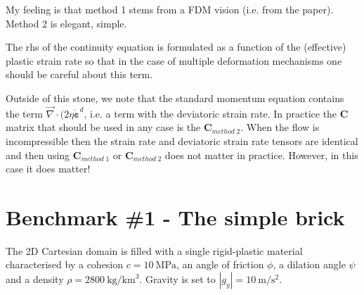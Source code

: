 My feeling is that method 1 stems from a FDM vision (i.e. from the paper). Method 2 is elegant, simple.

\begin{remark}
The rhs of the continuity equation is formulated as a function of the (effective) plastic strain rate so that 
in the case of multiple deformation mechanisms one should be careful about this term.
\end{remark}


\begin{remark}
Outside of this stone, we note that the standard momentum equation contains 
the term $\vec\nabla \cdot (2 \eta \dot{\bm \varepsilon}^d$,
i.e. a term with the deviatoric strain rate.
In practice the  ${\bm C}$ matrix that should be used in any case is the ${\bm C}_{method\; 2}$.
When the flow is incompressible then the strain rate and deviatoric strain rate tensors are 
identical and then using ${\bm C}_{method\; 1}$ or ${\bm C}_{method\; 2}$ does not 
matter in practice. However, in this case it does matter!
\end{remark}


\newpage 
\section*{Benchmark \#1 - The simple brick}

The 2D Cartesian domain is filled with a 
single rigid-plastic material characterised by a cohesion $c=10~\si{\mega\pascal}$, an 
angle of friction $\phi$, a dilation angle $\psi$ and a density $\rho=2800~\si{\kg\per\cubic\km}$.
Gravity is set to $|g_y|=10~\si{\metre\per\square\second}$.

